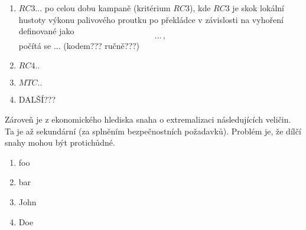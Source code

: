 \begin{enumerate}
	\item $RC3 ...$ po celou dobu kampaně (kritérium $RC3$), kde $RC3$ je skok lokální hustoty výkonu palivového proutku po překládce v závislosti na vyhoření
		definované jako 
		\begin{equation}
			...\,,
		\end{equation}
		počítá se ... (kodem??? ručně???)%
		
	\item $RC4 .. $ %

	\item $MTC .. $ %

	\item DALŠÍ??? %
\end{enumerate}

Zároveň je z ekonomického hlediska snaha o extremalizaci následujících veličin. Ta je až sekundární (za splněním bezpečnostních požadavků). Problém je, že dílčí 
snahy mohou být protichůdné. 
\begin{enumerate}
	\item foo
	\item bar
	\item John
	\item Doe
\end{enumerate}

